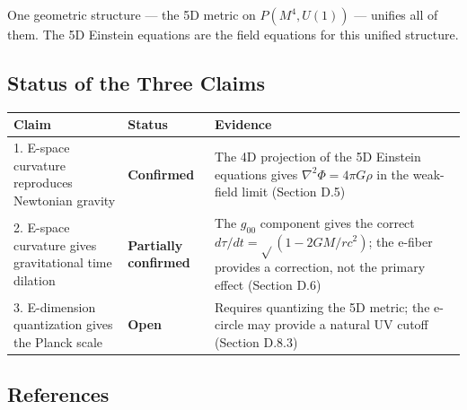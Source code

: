 \documentclass[aps,prd,preprint,superscriptaddress,longbibliography,floatfix]{revtex4-2}
\theoremstyle{remark}
\begin{document}
One geometric structure --- the 5D metric on $P(M^{4}, U(1))$ --- unifies all of them. The 5D Einstein equations are the field equations for this unified structure.



\subsection{Status of the Three Claims}


\begin{table}[H]
\begin{ruledtabular}
\begin{tabular}{p{5.0cm}p{5.0cm}p{5.0cm}}
Claim & Status & Evidence \\
\hline
1. E-space curvature reproduces Newtonian gravity & \textbf{Confirmed} & The 4D projection of the 5D Einstein equations gives $\nabla^{2}\Phi = 4\pi G\rho$ in the weak-field limit (Section D.5) \\
2. E-space curvature gives gravitational time dilation & \textbf{Partially confirmed} & The $g_{00}$ component gives the correct $d\tau/dt = \sqrt{}(1-2GM/rc^{2})$; the e-fiber provides a correction, not the primary effect (Section D.6) \\
3. E-dimension quantization gives the Planck scale & \textbf{Open} & Requires quantizing the 5D metric; the e-circle may provide a natural UV cutoff (Section D.8.3) \\
\end{tabular}
\end{ruledtabular}
\end{table}



\subsection{References}
\end{document}
